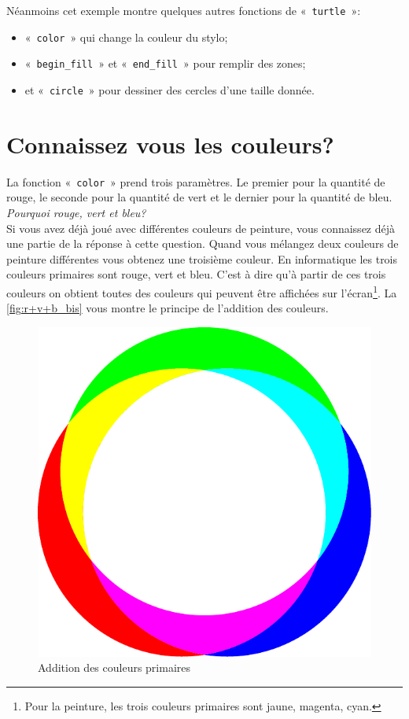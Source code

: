 Néanmoins cet exemple montre quelques autres fonctions de «~\texttt{turtle}~»:
\begin{itemize}
\item «~\texttt{color}~» qui change la couleur du stylo;
\item «~\texttt{begin\_fill}~» et «~\texttt{end\_fill}~» pour remplir des zones;
\item et «~\texttt{circle}~» pour dessiner des cercles d'une taille donnée.
\end{itemize}


\section{Connaissez vous les couleurs?}

La fonction «~\texttt{color}~» prend trois paramètres. Le premier pour la quantité de rouge, le seconde pour la quantité de vert et le dernier pour la quantité de bleu.\\

\emph{Pourquoi rouge, vert et bleu?}\\


Si vous avez déjà joué avec différentes couleurs de peinture, vous connaissez déjà une partie de la réponse à cette question. Quand vous mélangez deux couleurs de peinture différentes vous obtenez une troisième couleur. En informatique les trois couleurs primaires sont rouge, vert et bleu. C'est à dire qu'à partir de ces trois couleurs on obtient toutes des couleurs qui peuvent être affichées sur l'écran\footnote{Pour la peinture, les trois couleurs primaires sont jaune, magenta, cyan.}. La \autoref{fig:r+v+b_bis} vous montre le principe de l'addition des couleurs.

\begin{figure}[h!]
\centering
\includegraphics[scale=0.6]{images/r+v+b_bis}
\caption{Addition des couleurs primaires}\label{fig:r+v+b_bis}
\end{figure}



